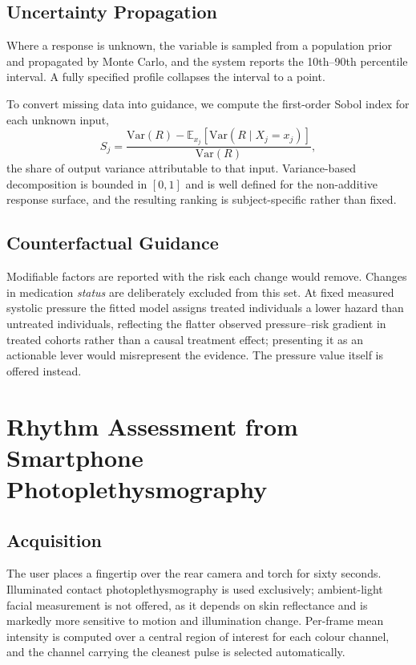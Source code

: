 \documentclass[conference]{IEEEtran}
\begin{document}
\subsection{Uncertainty Propagation}
Where a response is unknown, the variable is sampled from a population prior and
propagated by Monte Carlo, and the system reports the 10th--90th percentile
interval. A fully specified profile collapses the interval to a point.

To convert missing data into guidance, we compute the first-order Sobol index for
each unknown input,
\begin{equation}
S_j = \frac{\mathrm{Var}(R) - \mathbb{E}_{x_j}\!\left[\mathrm{Var}(R \mid X_j = x_j)\right]}{\mathrm{Var}(R)},
\end{equation}
the share of output variance attributable to that input. Variance-based
decomposition is bounded in $[0,1]$ and is well defined for the non-additive
response surface, and the resulting ranking is subject-specific rather than fixed.

\subsection{Counterfactual Guidance}
Modifiable factors are reported with the risk each change would remove. Changes in
medication \emph{status} are deliberately excluded from this set. At fixed measured
systolic pressure the fitted model assigns treated individuals a lower hazard than
untreated individuals, reflecting the flatter observed pressure--risk gradient in
treated cohorts rather than a causal treatment effect; presenting it as an
actionable lever would misrepresent the evidence. The pressure value itself is
offered instead.

\section{Rhythm Assessment from Smartphone Photoplethysmography}

\subsection{Acquisition}
The user places a fingertip over the rear camera and torch for sixty seconds.
Illuminated contact photoplethysmography is used exclusively; ambient-light facial
measurement is not offered, as it depends on skin reflectance and is markedly more
sensitive to motion and illumination change. Per-frame mean intensity is computed
over a central region of interest for each colour channel, and the channel
carrying the cleanest pulse is selected automatically.
\end{document}
